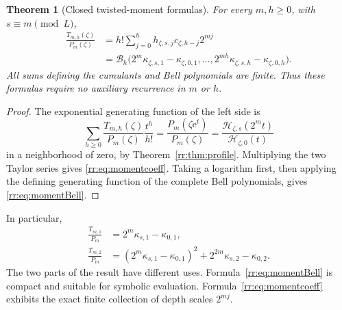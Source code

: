 \documentclass[11pt,a4paper,oneside,openany]{book}
\numberwithin{equation}{chapter}
\newtheorem{theorem}{Theorem}[chapter]
\theoremstyle{definition}
\theoremstyle{remark}
\newcommand{\e}{\mathrm e}
\newcommand{\B}{\mathcal B}
\newcommand{\Hp}{\mathcal H}
\begin{document}
\begin{theorem}[Closed twisted-moment formulas]
\label{rr:thm:moments}
For every \(m,h\geq0\), with \(s\equiv m\pmod L\),
\begin{align}
 \frac{T_{m,h}(\zeta)}{P_m(\zeta)}
 &=h!\sum_{j=0}^h h_{\zeta,s,j}c_{\zeta,h-j}2^{mj}
 \label{rr:eq:momentcoeff}\\
 &=\B_h\bigl(2^m\kappa_{\zeta,s,1}-\kappa_{\zeta,0,1},
      \ldots,2^{mh}\kappa_{\zeta,s,h}-\kappa_{\zeta,0,h}\bigr).
 \label{rr:eq:momentBell}
\end{align}
All sums defining the cumulants and Bell polynomials are finite. Thus these formulas require no auxiliary recurrence in \(m\) or \(h\).
\end{theorem}
\begin{proof}
The exponential generating function of the left side is
\[
 \sum_{h\geq0}\frac{T_{m,h}(\zeta)}{P_m(\zeta)}\frac{t^h}{h!}
 =\frac{P_m(\zeta\e^t)}{P_m(\zeta)}
 =\frac{\Hp_{\zeta,s}(2^mt)}{\Hp_{\zeta,0}(t)}
\]
in a neighborhood of zero, by Theorem~\ref{rr:thm:profile}. Multiplying the two Taylor series gives \eqref{rr:eq:momentcoeff}. Taking a logarithm first, then applying the defining generating function of the complete Bell polynomials, gives \eqref{rr:eq:momentBell}.
\end{proof}

In particular,
\begin{align}
 \frac{T_{m,1}}{P_m}&=2^m\kappa_{s,1}-\kappa_{0,1},\\
 \frac{T_{m,2}}{P_m}&=(2^m\kappa_{s,1}-\kappa_{0,1})^2
                         +2^{2m}\kappa_{s,2}-\kappa_{0,2}.
\end{align}
The two parts of the result have different uses. Formula~\eqref{rr:eq:momentBell} is compact and suitable for symbolic evaluation. Formula~\eqref{rr:eq:momentcoeff} exhibits the exact finite collection of depth scales \(2^{mj}\).
\end{document}
